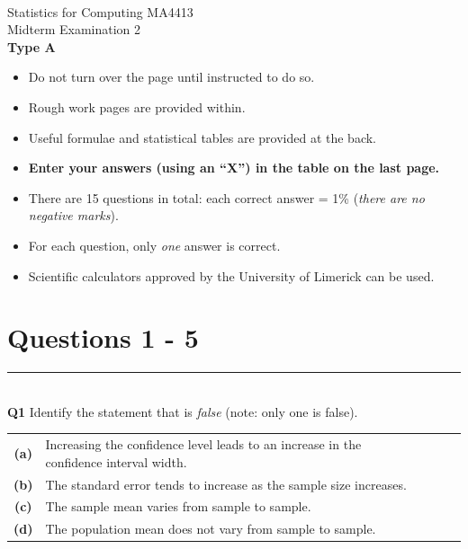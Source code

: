 \documentclass[12pt]{article}
\begin{document}
\quad\\[2cm]

\begin{center}
{\Huge Statistics for Computing MA4413\\[0.8cm]
Midterm Examination 2\\[1cm]
{\bf Type A}}\\[2cm]
\end{center}

\begin{itemize}\itemsep0.6cm
\item Do not turn over the page until instructed to do so.
\item Rough work pages are provided within.
\item Useful formulae and statistical tables are provided at the back.
\item {\bf Enter your answers (using an ``X'') in the table on the last page.}
\item There are 15 questions in total: each correct answer = 1\% (\emph{there are no negative marks}).
\item For each question, only \emph{one} answer is correct.
\item Scientific calculators approved by the University of Limerick can be used.
\end{itemize}

\newpage
\section*{Questions 1 - 5}


\rule{\linewidth}{1pt}
\quad\\
{\bf Q1} Identify the statement that is \emph{false} (note: only one is false).\\[0.2cm]
\begin{tabular}{c@{\,\,\,}llll}
{\bf(a)} & Increasing the confidence level leads to an increase in the confidence interval width.\\[0.2cm]
{\bf(b)} & The standard error tends to increase as the sample size increases. \\[0.2cm]
{\bf(c)} & The sample mean varies from sample to sample. \\[0.2cm]
{\bf(d)} & The population mean does not vary from sample to sample. \\[0.6cm]
\end{tabular}
\end{document}
